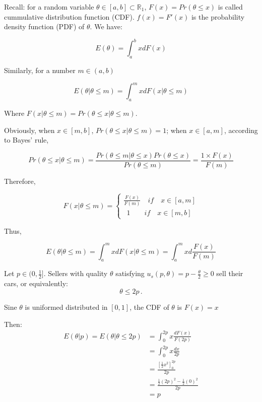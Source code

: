 \documentclass{article}
\newcommand{\R}{\mathbb{R}}
\begin{document}
\begin{mdframed}[backgroundcolor=blue!20,linecolor=white]

Recall: for a random variable $\theta \in [a,b] \subset \R_1$, $F(x) = Pr(\theta\le x)$ is called cummulative distribution function (CDF). $f(x)=F'(x)$ is the probability density function (PDF) of $\theta$. We have:

$$E(\theta) = \int^b_a x dF(x)$$

Similarly, for a number $m \in (a,b)$

$$E(\theta|\theta \le m) = \int^m_a x d F(x|\theta \le m)$$

Where $F(x|\theta \le m) = Pr(\theta \le x | \theta \le m)$. 

\medskip 

Obviously, when $x \in [m,b]$, $Pr(\theta \le x | \theta \le m)=1$; when $x \in [a,m]$, according to Bayes' rule,


 $$Pr(\theta \le x | \theta \le m)= \frac{Pr(\theta \le m | \theta \le x) Pr(\theta \le x)}{Pr(\theta \le m)} = \frac{1 \times F(x)}{F(m)}$$

Therefore,

\begin{equation}
F(x|\theta \le m)=
    \begin{cases}
\frac{F(x)}{F(m)} \quad if \quad x \in [a,m] \\
\ \ 1 \quad \quad if \quad x \in [m,b] 
    \end{cases}
\nonumber
\end{equation}

Thus,

$$E(\theta|\theta \le m) = \int^m_a x d F(x|\theta \le m)=\int^m_a x d \frac{F(x)}{F(m)}$$
\end{mdframed}

Let $p \in (0,\tfrac12]$. Sellers with quality $\theta$ satisfying $u_s(p,\theta)=p - \tfrac{\theta}2 \geq 0$ sell their cars, or equivalently:$$\theta \leq 2p \, .$$

\medskip

Sine $\theta$ is uniformed distributed in $[0,1]$, the CDF of $\theta$ is $F(x) = x$

\medskip

Then:
\begin{align*}
E(\theta | p) = E(\theta | \theta \leq 2p) &= \int_{0}^{2p}x\frac{dF(x)}{F(2p)} \\
&= \int_{0}^{2p} x\frac{dx}{2p} \\
&= \frac{\left[ \tfrac12 x^2 \right]^{2p}_0}{2p} \\
&= \frac{\tfrac12 (2p)^2 - \tfrac12 (0)^2}{2p} \\
&= p
\end{align*}
\end{document}
